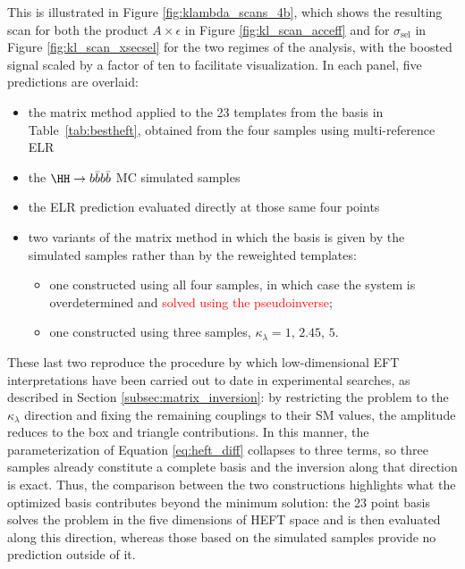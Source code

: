 This is illustrated in Figure \ref{fig:klambda_scans_4b}, which shows the resulting scan for both the product $A\times\epsilon$ in Figure \ref{fig:kl_scan_acceff} and for $\sigma_\text{sel}$ in Figure \ref{fig:kl_scan_xsecsel} for the two regimes of the analysis, with the boosted signal scaled by a factor of ten to facilitate visualization. In each panel, five predictions are overlaid: 
\begin{itemize}
    \item the matrix method applied to the 23 templates from the basis in Table~\ref{tab:bestheft}, obtained from the four samples using multi-reference ELR
    \item the $\HH\to b\bar{b}b\bar{b}$ MC simulated samples
    \item the ELR prediction evaluated directly at those same four points
    \item two variants of the matrix method in which the basis is given by the simulated samples rather than by the reweighted templates:
    \begin{itemize}
        \item one constructed using all four samples, in which case the system is overdetermined and \textcolor{red}{solved using the pseudoinverse};
        \item one constructed using three samples, $\kappa_\lambda = 1,\, 2.45,\, 5$.
    \end{itemize}
\end{itemize}
%
These last two reproduce the procedure by which low-dimensional EFT interpretations have been carried out to date in experimental searches, as described in Section \ref{subsec:matrix_inversion}: by restricting the problem to the $\kappa_\lambda$ direction and fixing the remaining couplings to their SM values, the amplitude reduces to the box and triangle contributions. In this manner, the parameterization of Equation \ref{eq:heft_diff} collapses to three terms, so three samples already constitute a complete basis and the inversion along that direction is exact. Thus, the comparison between the two constructions highlights what the optimized basis contributes beyond the minimum solution: the 23 point basis solves the problem in the five dimensions of HEFT space and is then evaluated along this direction, whereas those based on the simulated samples provide no prediction outside of it.\\
%

